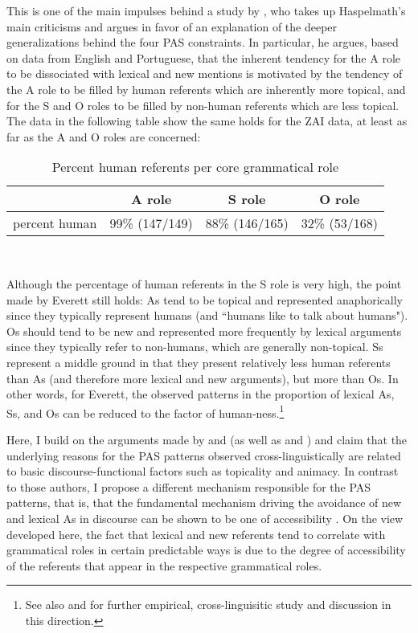 This is one of the main impulses behind a study by \citet{everett2009}, who takes up Haspelmath's main criticisms and argues in favor of an explanation of the deeper generalizations behind the four PAS constraints. In particular, he argues, based on data from English and Portuguese, that the inherent tendency for the A role to be dissociated with lexical and new mentions is motivated by the tendency of the A role to be filled by human referents which are inherently more topical, and for the S and O roles to be filled by non-human referents which are less topical. The data in the following table show the same holds for the ZAI data, at least as far as the A and O roles are concerned:

\begin{table}[htp] 
\begin{center}
\caption{\small{Percent human referents per core grammatical role}}
\begin{tabular}{| r | c | c | c |}\hline
 & A role & S role & O role\\
\hline
percent human & 99{\%} (147/149) & 88{\%} (146/165) & 32{\%} (53/168)  \\
  \hline
\end{tabular}\\
\label{humandist}
\end{center}
\end{table}
Although the percentage of human referents in the S role is very high, the point made by Everett still holds: As tend to be topical and represented anaphorically since they typically represent humans (and ``humans like to talk about humans"). Os should tend to be new and represented more frequently by lexical arguments since they typically refer to non-humans, which are generally non-topical. Ss represent a middle ground in that they present relatively less human referents than As (and therefore more lexical and new arguments), but more than Os. In other words, for Everett, the observed patterns in the proportion of lexical As, Ss, and Os can be reduced to the factor of human-ness.\footnote{See also \citealt{haig2016} and \citealt{schnell2017} for further empirical, cross-linguisitic study and discussion in this direction.} 

Here, I build on the arguments made by \citet{haspelmath2006} and \citet{everett2009} (as well as \citealt{haig2016} and \citealt{schnell2017}) and claim that the underlying reasons for the PAS patterns observed cross-linguistically are related to basic discourse-functional factors such as topicality and animacy. In contrast to those authors, I propose a different mechanism responsible for the PAS patterns, that is, that the fundamental mechanism driving the avoidance of new and lexical As in discourse can be shown to be one of accessibility \citep{ariel1990,ariel2001}. On the view developed here, the fact that lexical and new referents tend to correlate with grammatical roles in certain predictable ways is due to the degree of accessibility of the referents that appear in the respective grammatical roles.


